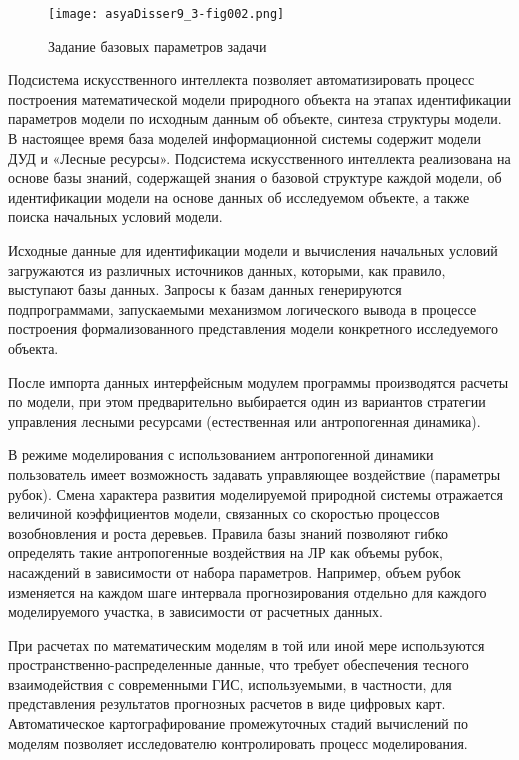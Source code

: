 \begin{figure}
\texttt{[image: asyaDisser9\_3-fig002.png]}
\caption{Задание базовых параметров задачи}\label{pic:basic_task_params}
\end{figure}

Подсистема искусственного интеллекта позволяет
автоматизировать процесс построения математической
модели природного объекта на этапах идентификации
параметров модели по исходным данным об объекте,
синтеза структуры модели. В настоящее время
база моделей информационной системы содержит
модели ДУД и «Лесные ресурсы». Подсистема искусственного
интеллекта реализована на основе базы знаний,
содержащей знания о базовой структуре каждой
модели, об идентификации модели на основе данных
об исследуемом объекте, а также поиска начальных
условий модели.

Исходные данные для идентификации модели и
вычисления начальных условий загружаются из
различных источников данных, которыми, как
правило, выступают базы данных. Запросы к базам
данных генерируются подпрограммами, запускаемыми
механизмом логического вывода в процессе построения
формализованного представления модели конкретного
исследуемого объекта.

После импорта данных интерфейсным модулем
программы производятся расчеты по модели, при
этом предварительно выбирается один из вариантов
стратегии управления лесными ресурсами (естественная
или антропогенная динамика).

В режиме моделирования с использованием антропогенной
динамики пользователь имеет возможность задавать
управляющее воздействие (параметры рубок).
Смена характера развития моделируемой природной
системы отражается величиной коэффициентов
модели, связанных со скоростью процессов возобновления
и роста деревьев. Правила базы знаний позволяют
гибко определять такие антропогенные воздействия
на ЛР как объемы рубок, насаждений в зависимости
от набора параметров. Например, объем рубок
изменяется на каждом шаге интервала прогнозирования
отдельно для каждого моделируемого участка,
в зависимости от расчетных данных.

При расчетах по математическим моделям в той
или иной мере используются пространственно-распределенные
данные, что требует обеспечения тесного взаимодействия
с современными ГИС, используемыми, в частности,
для представления результатов прогнозных расчетов
в виде цифровых карт. Автоматическое картографирование
промежуточных стадий вычислений по моделям
позволяет исследователю контролировать процесс
моделирования.

